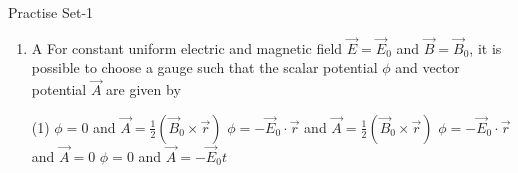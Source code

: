 \newpage
\begin{abox}
	Practise Set-1
\end{abox}
\begin{enumerate}
	\item  A For constant uniform electric and magnetic field $\vec{E}=\vec{E}_{0}$ and $\vec{B}=\vec{B}_{0}$, it is possible to choose a gauge such that the scalar potential $\phi$ and vector potential $\vec{A}$ are given by
	{}
	\begin{tasks}(1)
		\task[\textbf{A.}] $\phi=0$ and $\vec{A}=\frac{1}{2}\left(\vec{B}_{0} \times \vec{r}\right)$
		\task[\textbf{B.}] $\phi=-\vec{E}_{0} \cdot \vec{r}$ and $\vec{A}=\frac{1}{2}\left(\vec{B}_{0} \times \vec{r}\right)$
		\task[\textbf{C.}]  $\phi=-\vec{E}_{0} \cdot \vec{r}$ and $\vec{A}=0$
		\task[\textbf{D.}] $\phi=0$ and $\vec{A}=-\vec{E}_{0} t$
	\end{tasks}
	

\end{enumerate}
